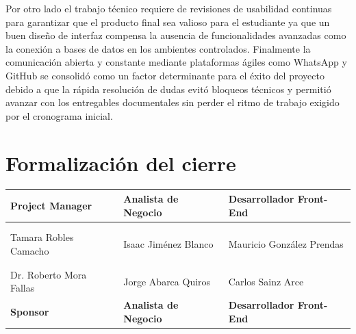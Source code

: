\documentclass[11pt,spanish]{article}
\begin{document}
Por otro lado el trabajo técnico requiere de revisiones de usabilidad continuas para garantizar que el producto final sea valioso para el estudiante ya que un buen diseño de interfaz compensa la ausencia de funcionalidades avanzadas como la conexión a bases de datos en los ambientes controlados. Finalmente la comunicación abierta y constante mediante plataformas ágiles como WhatsApp y GitHub se consolidó como un factor determinante para el éxito del proyecto debido a que la rápida resolución de dudas evitó bloqueos técnicos y permitió avanzar con los entregables documentales sin perder el ritmo de trabajo exigido por el cronograma inicial.

\section{Formalización del cierre}

\begin{table}[H]
\centering
\begin{tabularx}{\textwidth}{Y Y Y}
\toprule
\textbf{Project Manager} & \textbf{Analista de Negocio} & \textbf{Desarrollador Front-End} \\
\midrule
& & \\
& & \\
Tamara Robles Camacho & Isaac Jiménez Blanco & Mauricio González Prendas \\
\midrule
& & \\
& & \\
Dr. Roberto Mora Fallas & Jorge Abarca Quiros & Carlos Sainz Arce \\
\textbf{Sponsor} & \textbf{Analista de Negocio} & \textbf{Desarrollador Front-End} \\
\bottomrule
\end{tabularx}
\end{table}
\end{document}
